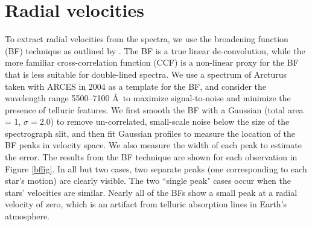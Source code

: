 \section{Radial velocities}\label{rvs}
To extract radial velocities from the spectra, we use the broadening function (BF) technique as outlined by \citet{ruc02}. The BF is a true linear de-convolution, while the more familiar cross-correlation function (CCF) is a non-linear proxy for the BF that is less suitable for double-lined spectra. We use a spectrum of Arcturus taken with ARCES in 2004 as a template for the BF, and consider the wavelength range 5500--7100 \AA \ to maximize signal-to-noise and minimize the presence of telluric features. We first smooth the BF with a Gaussian (total area = 1, $\sigma=2.0$)  to remove un-correlated, small-scale noise below the size of the spectrograph slit, and then fit Gaussian profiles to measure the location of the BF peaks in velocity space. We also measure the width of each peak to estimate the error. The results from the BF technique are shown for each observation in Figure \ref{bffig}. In all but two cases, two separate peaks (one corresponding to each star's motion) are clearly visible. The two ``single peak" cases occur when the stars' velocities are similar. Nearly all of the BFs show a small peak at a radial velocity of zero, which is an artifact from telluric absorption lines in Earth's atmosphere.


